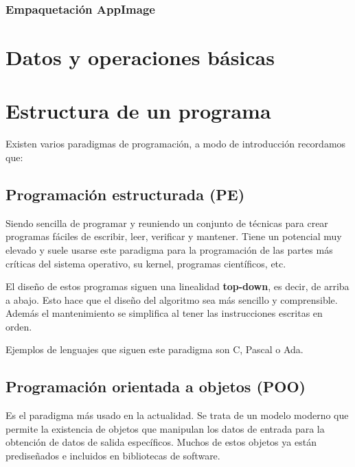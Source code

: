\documentclass[a4paper, 11pt, titlepage]{article}
\begin{document}
        \subsubsection{Empaquetación AppImage}
            

\section{Datos y operaciones básicas}


\section{Estructura de un programa}

    Existen varios paradigmas de programación, a modo de introducción recordamos que:

    \subsection{Programación estructurada (PE)} Siendo sencilla de programar y reuniendo un conjunto 
    de técnicas para crear programas fáciles de escribir, leer, verificar y mantener. Tiene un 
    potencial muy elevado y suele usarse este paradigma para la programación de las partes más
    críticas del sistema operativo, su kernel, programas científicos, etc.

    El diseño de estos programas siguen una linealidad \textbf{top-down}, es decir, de arriba a 
    abajo. Esto hace que el diseño del algoritmo sea más sencillo y comprensible. Además el 
    mantenimiento se simplifica al tener las instrucciones escritas en orden.

    Ejemplos de lenguajes que siguen este paradigma son C, Pascal o Ada.

    \subsection{Programación orientada a objetos (POO)} Es el paradigma más usado en la actualidad.
    Se trata de un modelo moderno que permite la existencia de objetos que manipulan los datos 
    de entrada para la obtención de datos de salida específicos. Muchos de estos objetos ya están 
    prediseñados e incluidos en bibliotecas de software.
\end{document}
